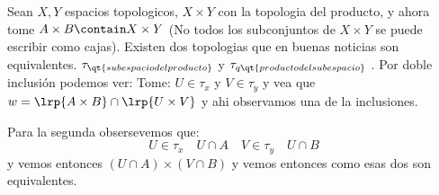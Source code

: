 Sean $X,Y$ espacios topologicos, $ X \times Y$ con la topologia del producto, y ahora tome $ A \times B \contain X \times Y$ (No todos los subconjuntos de $ X \times Y$ se puede escribir como cajas). Existen dos topologias que en buenas noticias son equivalentes. $ \tau_{\qt{subespacio del producto}}$ y  $ \tau_{q\qt{producto del subespacio}} $ . Por doble inclusión podemos ver:
Tome: $ U \in \tau_x $ y $ V \in \tau_y$ y vea que $ w = \lrp{A \times B} \cap \lrp{U \times V} $ y ahi observamos una de la inclusiones.

Para la segunda obsersevemos que:
\[ U \in \tau_x \quad U \cap A \quad V \in \tau_y \quad U \cap B \] y vemos entonces $ (U \cap A) \times (V \cap B) $ y vemos entonces como esas dos son equivalentes.